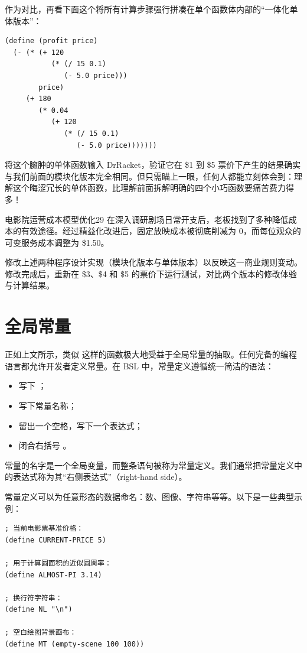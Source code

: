 作为对比，再看下面这个将所有计算步骤强行拼凑在单个函数体内部的“一体化单体版本”：
\begin{lstlisting}[language=BSL]
(define (profit price)
  (- (* (+ 120
           (* (/ 15 0.1)
              (- 5.0 price)))
        price)
     (+ 180
        (* 0.04
           (+ 120
              (* (/ 15 0.1)
                 (- 5.0 price)))))))
\end{lstlisting}

将这个臃肿的单体函数输入 DrRacket，验证它在 \$1 到 \$5 票价下产生的结果确实与我们前面的模块化版本完全相同。但只需瞄上一眼，任何人都能立刻体会到：理解这个晦涩冗长的单体函数，比理解前面拆解明确的四个小巧函数要痛苦费力得多！

\begin{exercise}{电影院运营成本模型优化}{29}
在深入调研剧场日常开支后，老板找到了多种降低成本的有效途径。经过精益化改进后，固定放映成本被彻底削减为 0，而每位观众的可变服务成本调整为 \$1.50。

修改上述两种程序设计实现（模块化版本与单体版本）以反映这一商业规则变动。修改完成后，重新在 \$3、\$4 和 \$5 的票价下运行测试，对比两个版本的修改体验与计算结果。
\end{exercise}


\section{全局常量}
\label{sec:2.4}

正如上文所示，类似  这样的函数极大地受益于全局常量的抽取。任何完备的编程语言都允许开发者定义常量。在 BSL 中，常量定义遵循统一简洁的语法：
\begin{itemize}
  \item 写下 ；
  \item 写下常量名称；
  \item 留出一个空格，写下一个表达式；
  \item 闭合右括号 \code{)}。
\end{itemize}

常量的名字是一个全局变量，而整条语句被称为常量定义。我们通常把常量定义中的表达式称为其“右侧表达式”（right-hand side）。

常量定义可以为任意形态的数据命名：数、图像、字符串等等。以下是一些典型示例：
\begin{lstlisting}[language=BSL]
; 当前电影票基准价格：
(define CURRENT-PRICE 5)

; 用于计算圆面积的近似圆周率：
(define ALMOST-PI 3.14)

; 换行符字符串：
(define NL "\n")

; 空白绘图背景画布：
(define MT (empty-scene 100 100))
\end{lstlisting}

